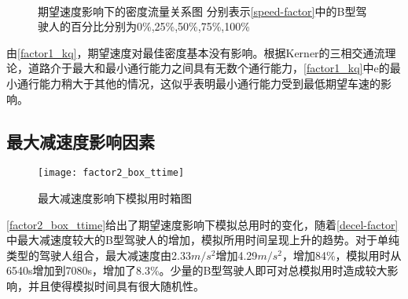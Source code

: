 \begin{figure}[H]%
\centering
{}%
\\%
%
\caption[A set of four sub-floats.]{期望速度影响下的密度流量关系图
分别表示\autoref{speed-factor}中的B型驾驶人的百分比分别为0\%,25\%,50\%,75\%,100\%}%
\label{factor1_kq}%
\end{figure}

由\autoref{factor1_kq}，期望速度对最佳密度基本没有影响。根据Kerner的三相交通流理论，道路介于最大和最小通行能力之间具有无数个通行能力，\autoref{factor1_kq}中e的最小通行能力稍大于其他的情况，这似乎表明最小通行能力受到最低期望车速的影响。


\subsection{最大减速度影响因素}

\begin{figure}[H]
\begin{center}
\texttt{[image: factor2\_box\_ttime]}
\caption{最大减速度影响下模拟用时箱图}
\label{factor2_box_ttime}
\end{center}
\end{figure}

\autoref{factor2_box_ttime}给出了期望速度影响下模拟总用时的变化，随着\autoref{decel-factor}中最大减速度较大的B型驾驶人的增加，模拟所用时间呈现上升的趋势。对于单纯类型的驾驶人组合，最大减速度由2.33$m/s^2$增加4.29$m/s^2$，增加84\%，模拟用时从6540s增加到7080s，增加了8.3\%。少量的B型驾驶人即可对总模拟用时造成较大影响，并且使得模拟时间具有很大随机性。


